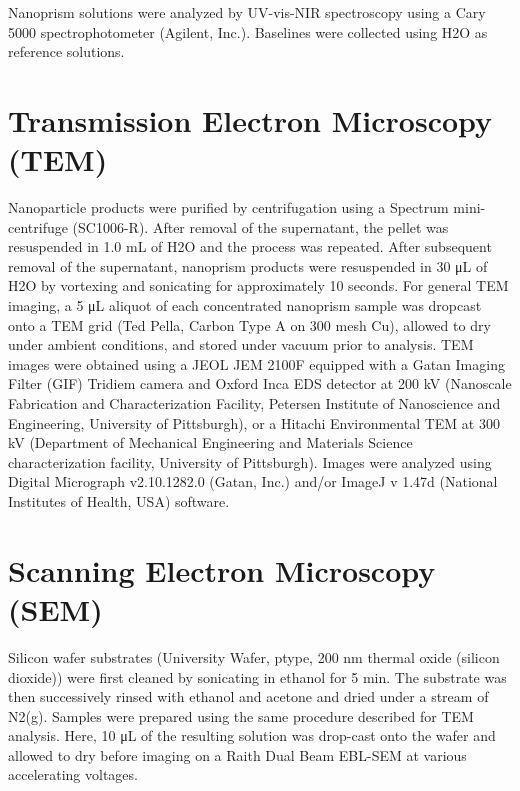 \documentclass [11pt, proquest] {uwthesis}[2016/11/22]
\begin{document}
Nanoprism solutions were analyzed by UV-vis-NIR spectroscopy using a Cary 5000 spectrophotometer (Agilent, Inc.). Baselines were collected using H2O as reference solutions.

\section{Transmission Electron Microscopy (TEM)}

Nanoparticle products were purified by centrifugation using a Spectrum mini-centrifuge (SC1006-R). After removal of the supernatant, the pellet was resuspended in 1.0 mL of H2O and the process was repeated. After subsequent removal of the supernatant, nanoprism products were resuspended in 30 μL of H2O by vortexing and sonicating for approximately 10 seconds. For general TEM imaging, a 5 μL aliquot of each concentrated nanoprism sample was dropcast onto a TEM grid (Ted Pella, Carbon Type A on 300 mesh Cu), allowed to dry under ambient conditions, and stored under vacuum prior to analysis. TEM images were obtained using a JEOL JEM 2100F equipped with a Gatan Imaging Filter (GIF) Tridiem camera and Oxford Inca EDS detector at 200 kV (Nanoscale Fabrication and Characterization Facility, Petersen Institute of Nanoscience and Engineering, University of Pittsburgh), or a Hitachi Environmental TEM at 300 kV (Department of Mechanical Engineering and Materials Science characterization facility, University of Pittsburgh). Images were analyzed using Digital Micrograph v2.10.1282.0 (Gatan, Inc.) and/or ImageJ v 1.47d (National Institutes of Health, USA) software.

\section{Scanning Electron Microscopy (SEM)}

Silicon wafer substrates (University Wafer, ptype, 200 nm thermal oxide (silicon dioxide)) were first cleaned by sonicating in ethanol for 5 min. The substrate was then successively rinsed with ethanol and acetone and dried under a stream of N2(g). Samples were prepared using the same procedure described for TEM analysis. Here, 10 μL of the resulting solution was drop-cast onto the wafer and allowed to dry before imaging on a Raith Dual Beam EBL-SEM at various accelerating voltages.
\end{document}
